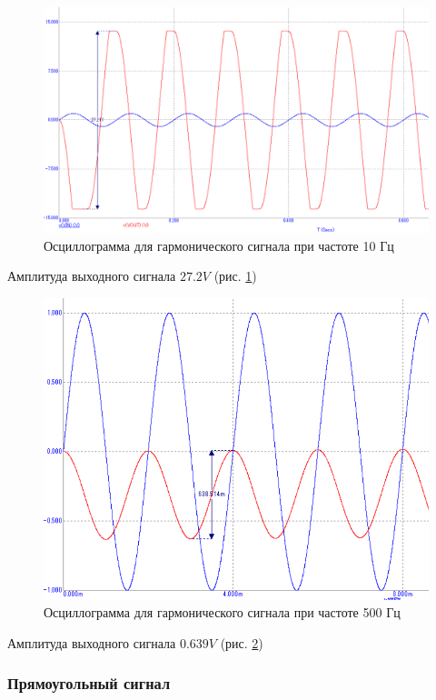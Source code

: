 \documentclass[a4paper,14pt]{article}
\begin{document}
\begin{figure}[H]
	\centering
	\includegraphics[width=0.9\linewidth]{../imgs/tran_sin_10Hz}
	\caption{Осциллограмма для гармонического сигнала при частоте 10 Гц}
	\label{fig:tran_sin_10Hz}
\end{figure}

Амплитуда выходного сигнала $27.2V$ (рис. \ref{fig:tran_sin_10Hz})

\begin{figure}[H]
	\centering
	\includegraphics[width=0.7\linewidth]{../imgs/tran_sin_500Hz}
	\caption{Осциллограмма для гармонического сигнала при частоте 500 Гц}
	\label{fig:tran_sin_500Hz}
\end{figure}

Амплитуда выходного сигнала $0.639V$ (рис. \ref{fig:tran_sin_500Hz})

\subsubsection{Прямоугольный сигнал}
\end{document}
